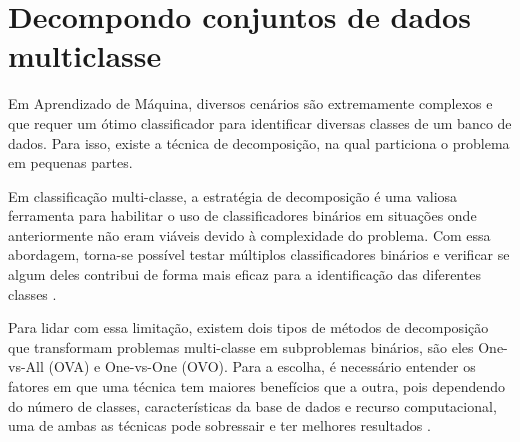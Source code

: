 \section{Decompondo conjuntos de dados multiclasse}
\label{subsec-decompondo}

Em Aprendizado de Máquina, diversos cenários são extremamente complexos e que requer um ótimo
classificador para identificar diversas classes de um banco de dados. Para isso, existe a técnica
de decomposição, na qual particiona o problema em pequenas partes.

Em classificação multi-classe, a estratégia de decomposição é uma valiosa ferramenta para habilitar
o uso de classificadores binários em situações onde anteriormente não eram viáveis devido
à complexidade do problema. Com essa abordagem, torna-se possível testar múltiplos
classificadores binários e verificar se algum deles contribui de forma mais eficaz para
a identificação das diferentes classes \cite{elkano2016fuzzy}.

Para lidar com essa limitação, existem dois tipos de métodos de decomposição que transformam
problemas multi-classe em subproblemas binários, são eles One-vs-All (OVA) e One-vs-One (OVO).
Para a escolha, é necessário entender os fatores em que uma técnica tem maiores benefícios que
a outra, pois dependendo do número de classes, características da base de dados e recurso computacional,
uma de ambas as técnicas pode sobressair e ter melhores resultados \cite{li2020multiclass}.


